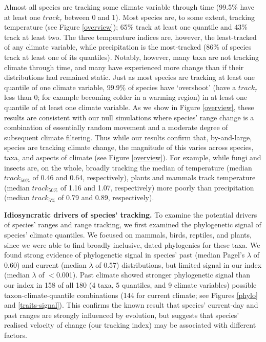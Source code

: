 \documentclass[12pt]{report}
\begin{document}
Almost all species are tracking some climate variable through time
(99.5\% have at least one $track_\tau$ between 0 and 1). Most species
are, to some extent, tracking temperature (see Figure \ref{overview});
65\% track at least one quantile and 43\% track at least two.
The three temperature indices are, however, the least-tracked of any
climate variable, while precipitation is the most-tracked (86\% of
species track at least one of its quantiles). Notably, however, many
taxa are not tracking climate through time, and many have experienced
more change than if their distributions had remained static. Just as
most species are tracking at least one quantile of one climate
variable, 99.9\% of species have `overshoot' (have a $track_\tau$ less
than 0; for example becoming colder in a warming region) in at least
one quantile of at least one climate variable. As we show in Figure
\ref{overview}, these results are consistent with our null simulations
where species' range change is a combination of essentially random
movement and a moderate degree of subsequent climate filtering. Thus
while our results confirm that, by-and-large, species are tracking
climate change, the magnitude of this varies across species, taxa, and
aspects of climate (see Figure \ref{overview}). For example, while
fungi and insects are, on the whole, broadly tracking the median of
temperature (median $track_{50\%}$ of 0.46 and 0.64, respectively),
plants and mammals track temperature (median $track_{50\%}$ of 1.16
and 1.07, respectively) more poorly than precipitation (median
$track_{5\%}$ of 0.79 and 0.89, respectively).

\textbf{Idiosyncratic drivers of species' tracking.} To examine the
potential drivers of species' ranges and range tracking, we first
examined the phylogenetic signal of species' climate quantiles. We
focused on mammals, birds, reptiles, and plants, since we were able to
find broadly inclusive, dated phylogenies for these taxa. We found
strong evidence of phylogenetic signal in species' past (median
Pagel's $\lambda$\supercite{Pagel1999} of 0.60) and current (median
$\lambda$ of 0.57) distributions, but limited signal in our index
(median $\lambda$ of $<$0.001). Past climate showed stronger
phylogenetic signal than our index in 158 of all 180 (4 taxa, 5
quantiles, and 9 climate variables) possible taxon-climate-quantile
combinations (144 for current climate; see Figures \ref{phylo} and
\ref{traits-signal}). This confirms the known result that species'
current-day and past ranges are strongly influenced by
evolution\supercite{Wiens2010}, but suggests that species' realised
velocity of change (our tracking index) may be associated with
different factors.
\end{document}
